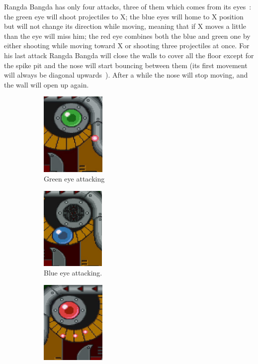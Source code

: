 Rangda Bangda has only four attacks, three of them which comes from its eyes~\cite{wiki:Rangda_bangda}: the green eye will shoot projectiles to X; the blue eyes will home to X position but will not change its direction while moving, meaning that if X moves a little than the eye will miss him; the red eye combines both the blue and green one by either shooting while moving toward X or shooting three projectiles at once. For his last attack Rangda Bangda will close the walls to cover all the floor except for the spike pit and the nose will start bouncing between them (its first movement will always be diagonal upwards~\cite{stratwiki:Sigma_stage_2}). After a while the nose will stop moving, and the wall will open up again.
\begin{figure}[htp]
	\centering
	\begin{subfigure}[t]{0.30\linewidth}
		\centering
		\includegraphics[height=4cm]{figures/X1/Sigma_stages/Rangda_green.jpg}
		\caption{Green eye attacking}
	\end{subfigure}
	\begin{subfigure}[t]{0.30\linewidth}
		\centering
		\includegraphics[height=4cm]{figures/X1/Sigma_stages/Rangda_blue.jpg}
		\caption{Blue eye attacking.}
	\end{subfigure}
	\begin{subfigure}[t]{0.30\linewidth}
		\centering
		\includegraphics[height=4cm]{figures/X1/Sigma_stages/Rangda_red_1.jpg}

\end{subfigure}
\end{figure}
